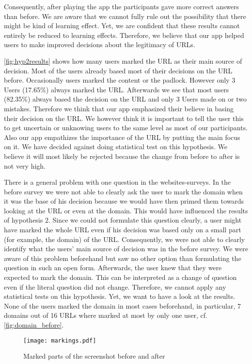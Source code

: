 \begin{description}[leftmargin=0cm]
Consequently, after playing the app the participants gave more correct answers than before.
We are aware that we cannot fully rule out the possibility that there might be kind of learning effect.
Yet, we are confident that these results cannot entirely be reduced to learning effects.
Therefore, we believe that our app helped users to make improved decisions about the legitimacy of URLs.
\item[Hypothesis 2:]
\autoref{fig:hyp2results} shows how many users marked the URL as their main source of decision.
Most of the users already based most of their decisions on the URL before.
Occasionally users marked the content or the padlock.
However only 3 Users (17.65\%) always marked the URL.
Afterwards we see that most users (82.35\%) always based the decision on the URL and only 3 Users made on or two mistakes.
Therefore we think that our app emphasized their believe in basing their decision on the URL.
We however think it is important to tell the user this to get uncertain or unknowing users to the same level as most of our participants.
Also our app empathizes the importance of the URL by putting the main focus on it.
We have decided against doing statistical test on this hypothesis.
We believe it will most likely be rejected because the change from before to after is not very high.
\item[Hypothesis 3:]
There is a general problem with one question in the websites-surveys.
In the before survey we were not able to clearly ask the user to mark the domain when it was the base of his decision because we would have then primed them towards looking at the URL or even at the domain.
This would have influenced the results of hypothesis 2.
Since we could not formulate this question clearly, a user might have marked the whole URL even if his decision was based only on a small part (for example, the domain) of the URL.
Consequently, we were not able to clearly identify what the users' main source of decision was in the before survey.
We were aware of this problem beforehand but saw no other option than formulating the question in such an open form.
Afterwards, the user knew that they were expected to mark the domain.
This can be interpreted as a change of question even if the literal question did not change.
Therefore, we cannot apply any statistical tests on this hypothesis.
Yet, we want to have a look at the results.
None of the users marked the domain in most cases beforehand, in particular, 7 domains out of 16 URLs where marked at most by only one user, cf. \autoref{fig:domain_before}.
\begin{figure}
\centering
\texttt{[image: markings.pdf]}
\caption{Marked parts of the screenshot before and after}
\label{fig:markings}
\end{figure}


\end{description}
